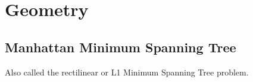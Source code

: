\chapter{Geometry}

\section{Manhattan Minimum Spanning Tree}

    Also called the rectilinear or L1 Minimum Spanning Tree problem.
    

